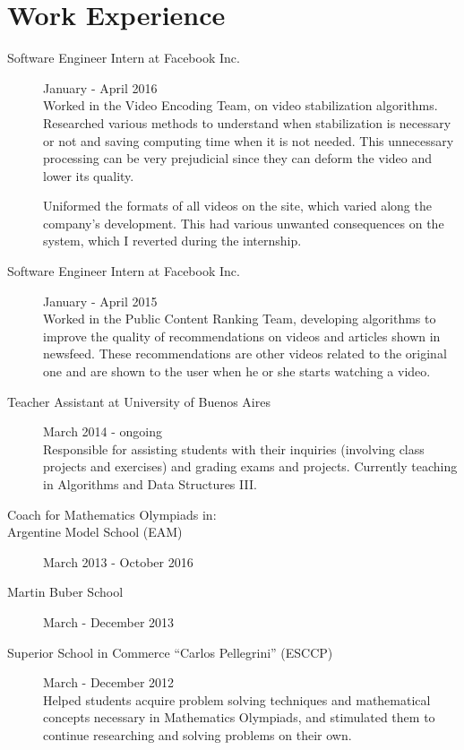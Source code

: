 \documentclass [a4paper, 11pt]{article}
\newcommand{\tabu}{\hspace*{0.7cm}}
\begin{document}
\section* {Work Experience}

\begin{description}
  \item[Software Engineer Intern at Facebook Inc.] {\hfill January - April 2016\\
  Worked in the Video Encoding Team, on video stabilization algorithms. Researched various methods to understand when stabilization is necessary or not and saving computing time when it is not needed. This unnecessary processing can be very prejudicial since they can deform the video and lower its quality.

Uniformed the formats of all videos on the site, which varied along the company's development. This had various unwanted consequences on
the system, which I reverted during the internship.
}

  \item[Software Engineer Intern at Facebook Inc.] {\hfill January - April 2015\\
Worked in the Public Content Ranking Team, developing algorithms to improve the quality of recommendations on videos and articles shown in newsfeed. These recommendations are other videos related to the original one and are shown to the user when he or she starts watching a video.
}

  \item[Teacher Assistant at University of Buenos Aires] {\hfill March 2014 - ongoing\\
  Responsible for assisting students with their inquiries (involving class projects and 
  exercises) and grading exams and projects. Currently teaching in Algorithms 
  and Data Structures III.\\
}
\item[Coach for Mathematics Olympiads in:]
\item[\tabu Argentine Model School (EAM)] {\hfill March 2013 - October 2016}
\item[\tabu Martin Buber School] {\hfill March - December 2013}
\item[\tabu Superior School in Commerce ``Carlos Pellegrini'' (ESCCP)] { \hfill March - December 2012 \\
Helped students acquire problem solving techniques and mathematical concepts necessary in Mathematics Olympiads, and stimulated them to continue researching and solving problems on their own.
	}

\end{description}
\end{document}

